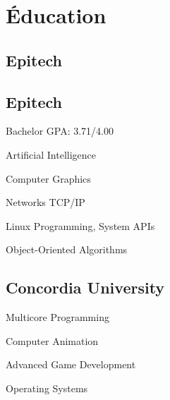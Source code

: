 \documentclass[
  french,
  a4paper
]{resume-openfont}
\begin{document}
\noindent%
\begin{minipage}[t]{0.31\textwidth}



\section{Éducation}

\subsection{Epitech}
\subtitle{Master en Informatique}
\sectionsep

\subsection{Epitech}
\subtitle{Bachelor en Informatique}
Bachelor GPA: 3.71/4.00
\vspace{0.8\topsep} %
\begin{coursework}
\item Artificial Intelligence
\item Computer Graphics
\item Networks TCP/IP
\item Linux Programming, System APIs
\item Object-Oriented Algorithms
\end{coursework}
\sectionsep

\subsection{Concordia University}
\subtitle{Étudiant international en informatique, niveau master}
\begin{coursework}
\item Multicore Programming
\item Computer Animation
\item Advanced Game Development
\item Operating Systems
\end{coursework}



\end{minipage}
\end{document}
